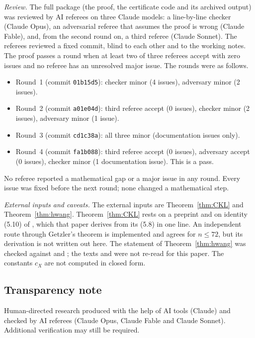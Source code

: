 \documentclass[11pt]{amsart}
\theoremstyle{definition}
\theoremstyle{remark}
\numberwithin{equation}{section}
\begin{document}
\emph{Review.} The full package (the proof, the certificate code and its archived output) was reviewed by AI referees on three Claude models: a line-by-line checker (Claude Opus), an adversarial referee that assumes the proof is wrong (Claude Fable), and, from the second round on, a third referee (Claude Sonnet). The referees reviewed a fixed commit, blind to each other and to the working notes. The proof passes a round when at least two of three referees accept with zero issues and no referee has an unresolved major issue. The rounds were as follows.
\begin{itemize}
\item Round~1 (commit \texttt{01b15d5}): checker minor (4 issues), adversary minor (2 issues).
\item Round~2 (commit \texttt{a01e04d}): third referee accept (0 issues), checker minor (2 issues), adversary minor (1 issue).
\item Round~3 (commit \texttt{cd1c38a}): all three minor (documentation issues only).
\item Round~4 (commit \texttt{fa1b088}): third referee accept (0 issues), adversary accept (0 issues), checker minor (1 documentation issue). This is a pass.
\end{itemize}
No referee reported a mathematical gap or a major issue in any round. Every issue was fixed before the next round; none changed a mathematical step.

\emph{External inputs and caveats.} The external inputs are Theorem~\ref{thm:CKL} and Theorem~\ref{thm:hwang}. Theorem~\ref{thm:CKL} rests on a preprint \cite{CKL} and on identity (5.10) of \cite{CK}, which that paper derives from its (5.8) in one line. An independent route through Getzler's theorem \cite{Ge} is implemented and agrees for \(n\le72\), but its derivation is not written out here. The statement of Theorem~\ref{thm:hwang} was checked against \cite[Thm.~2.3]{CK} and \cite[Thm.~2.22]{Dr}; the texts \cite{Hw} and \cite{FS} were not re-read for this paper. The constants \(c_X\) are not computed in closed form.

\subsection*{Transparency note}

Human-directed research produced with the help of AI tools (Claude) and checked by AI referees (Claude Opus, Claude Fable and Claude Sonnet). Additional verification may still be required.
\end{document}
